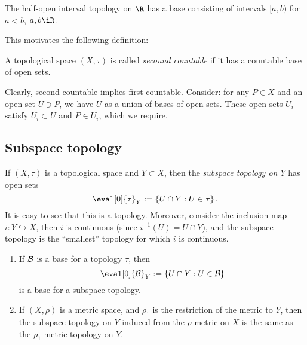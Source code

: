\begin{example}
	The half-open interval topology on $\R$ has a base consisting of intervals $[a,b)$ for $a<b$, $a,b\iR$.
\end{example}

This motivates the following definition:

\begin{definition}
	A topological space $(X,\tau)$ is called \emph{secound countable} if it has a countable base of open sets.
\end{definition}

Clearly, second countable implies first countable. Consider: for any $P\in X$ and an open set $U \ni P$, we have $U$ as a union of bases of open sets. These open sets $U_i$ satisfy $U_i \subset U$ and $P \in U_i$, which we require.


\subsection{Subspace topology} %
\label{sub:subspace_topology}

\begin{definition}
	If $(X,\tau)$ is a topological space and $Y\subset X$, then the \emph{subspace topology on $Y$} has open sets
	\begin{equation*}
		\eval[0]{\tau}_Y := \left\{U \cap Y: U\in\tau\right\}.
	\end{equation*}
	It is easy to see that this is a topology. Moreover, consider the inclusion map $i:Y \hookrightarrow X$, then $i$ is continuous (since $i^{-1}(U) = U\cap Y$), and the subspace topology is the ``smallest'' topology for which $i$ is continuous.
\end{definition}

\begin{proposition}
\mbox{}
\begin{enumerate}
	\shortskip
	\item If $\cal{B}$ is a base for a topology $\tau$, then
	\begin{equation*}
		\eval[0]{\base}_Y := \left\{U \cap Y: U \in\base\right\}
	\end{equation*}
	is a base for a subspace topology.
	\item If $(X,\rho)$ is a metric space, and $\rho_1$ is the restriction of the metric to $Y$, then the subspace topology on $Y$ induced from the $\rho$-metric on $X$ is the same as the $\rho_1$-metric topology on $Y$.
\end{enumerate}
\end{proposition}

